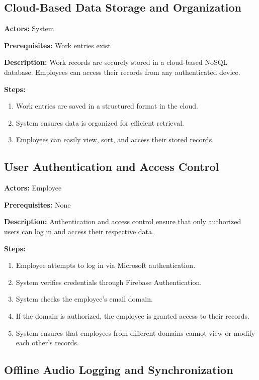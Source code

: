 \documentclass[
  digital,     %
  oneside,     %
  nosansbold,  %
  nocolorbold, %
  lof,         %
  lot,         %
]{fithesis4}
\begin{document}
\subsection{Cloud-Based Data Storage and Organization}

\noindent \textbf{Actors:} System

\noindent \textbf{Prerequisites:} Work entries exist

\noindent \textbf{Description:}  
Work records are securely stored in a cloud-based NoSQL database. Employees can access their records from any authenticated device.

\noindent \textbf{Steps:}
\begin{enumerate}
    \item Work entries are saved in a structured format in the cloud.
    \item System ensures data is organized for efficient retrieval.
    \item Employees can easily view, sort, and access their stored records.
\end{enumerate}

\subsection{User Authentication and Access Control}

\noindent \textbf{Actors:} Employee

\noindent \textbf{Prerequisites:} None

\noindent \textbf{Description:}  
Authentication and access control ensure that only authorized users can log in and access their respective data.

\noindent \textbf{Steps:}
\begin{enumerate}
    \item Employee attempts to log in via Microsoft authentication.
    \item System verifies credentials through Firebase Authentication.
    \item System checks the employee’s email domain.
    \item If the domain is authorized, the employee is granted access to their records.
    \item System ensures that employees from different domains cannot view or modify each other's records.
\end{enumerate}

\subsection{Offline Audio Logging and Synchronization}
\end{document}
